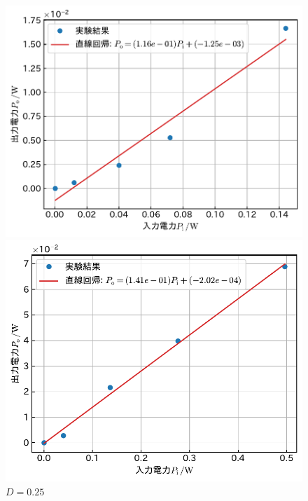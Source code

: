 \documentclass[1_power_supply.tex]{subfiles}
\begin{document}
    \begin{figure}[htbp]
      \begin{minipage}{0.45\columnwidth}
        \centering
        \includegraphics[width=0.8\columnwidth]{2_10p.pdf}
        \caption{$D=0.1$}\label{fig:2_10p}
      \end{minipage}
      \begin{minipage}{0.45\columnwidth}
        \centering
        \includegraphics[width=0.8\columnwidth]{2_25p.pdf}
        \caption{$D=0.25$}\label{fig:2_25p}
      \end{minipage}


\end{figure}
\end{document}
